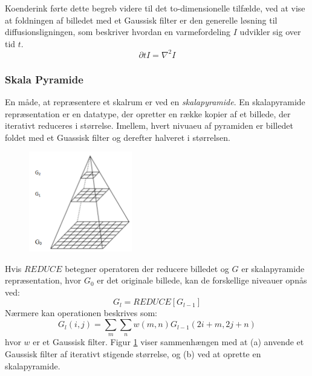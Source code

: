 Koenderink \cite{koen} førte dette begreb videre til det to-dimensionelle tilfælde, ved at vise at foldningen af billedet med et Gaussisk filter er den generelle løsning til diffusionsligningen, som beskriver hvordan en varmefordeling $I$ udvikler sig over tid $t$.
$$ \partial t I = \nabla^2I $$
\subsubsection*{Skala Pyramide}
En måde, at repræsentere et skalrum er ved en \textit{skalapyramide}. En skalapyramide repræsentation er en datatype, der opretter en række kopier af et billede, der iterativt reduceres i størrelse. Imellem, hvert nivuaeu af pyramiden er billedet foldet med et Guassisk filter og derefter halveret i størrelsen.
\begin{figure}[H]
    \centering
    \includegraphics[width=0.40\textwidth]{fig/40.png}
     \vspace{-1em}
    \begin{center}    
       \caption{\textcolor{gray}{\footnotesize \textit{ }}}
    \label{fig:scalerepdiff}
     \end{center}
     \vspace{-2.5em}
  \end{figure} \noindent
Hvis $REDUCE$ betegner operatoren der reducere billedet og $G$ er skalapyramide repræsentation, hvor $G_0$ er det originale billede, kan de forskellige niveauer opnås ved:
\begin{equation}
G_l =REDUCE[G_{l-1}]
\end{equation}
Nærmere kan operationen beskrives som:
\begin{equation}
G_l(i,j)=\sum\limits_{m}\sum\limits_{n}w(m,n)G_{l-1}(2i+m,2j+n)
\end{equation}
hvor $w$ er et Gaussisk filter. Figur \ref{fig:scalerepdiff} viser sammenhængen med at (a) anvende et Gaussisk filter af iterativt stigende størrelse, og (b) ved at oprette en skalapyramide.
